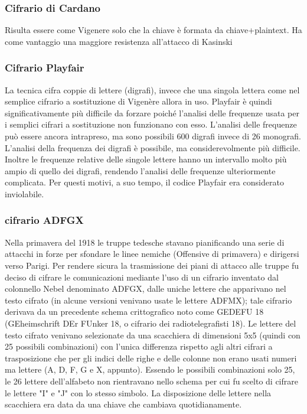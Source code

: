 \documentclass[10pt,a4paper]{article}
\begin{document}
\subsubsection{Cifrario di Cardano}
Risulta essere come Vigenere solo che la chiave è formata da chiave+plaintext. Ha come vantaggio una maggiore resistenza all'attacco di Kasinski

\subsubsection{Cifrario Playfair}
La tecnica cifra coppie di lettere (digrafi), invece che una singola lettera come nel semplice cifrario a sostituzione di Vigenère allora in uso. Playfair è quindi significativamente più difficile da forzare poiché l'analisi delle frequenze usata per i semplici cifrari a sostituzione non funzionano con esso. L'analisi delle frequenze può essere ancora intrapreso, ma sono possibili 600 digrafi invece di 26 monografi. L'analisi della frequenza dei digrafi è possibile, ma considerevolmente più difficile. Inoltre le frequenze relative delle singole lettere hanno un intervallo molto più ampio di quello dei digrafi, rendendo l’analisi delle frequenze ulteriormente complicata. Per questi motivi, a suo tempo, il codice Playfair era considerato inviolabile.

\subsubsection{cifrario ADFGX}

Nella primavera del 1918 le truppe tedesche stavano pianificando una serie di attacchi in forze per sfondare le linee nemiche (Offensive di primavera) e dirigersi verso Parigi. Per rendere sicura la trasmissione dei piani di attacco alle truppe fu deciso di cifrare le comunicazioni mediante l'uso di un cifrario inventato dal colonnello Nebel denominato ADFGX, dalle uniche lettere che apparivano nel testo cifrato (in alcune versioni venivano usate le lettere ADFMX); tale cifrario derivava da un precedente schema crittografico noto come GEDEFU 18 (GEheimschrift DEr FUnker 18, o cifrario dei radiotelegrafisti 18). Le lettere del testo cifrato venivano selezionate da una scacchiera di dimensioni 5x5 (quindi con 25 possibili combinazioni) con l'unica differenza rispetto agli altri cifrari a trasposizione che per gli indici delle righe e delle colonne non erano usati numeri ma lettere (A, D, F, G e X, appunto). Essendo le possibili combinazioni solo 25, le 26 lettere dell'alfabeto non rientravano nello schema per cui fu scelto di cifrare le lettere "I" e "J" con lo stesso simbolo. La disposizione delle lettere nella scacchiera era data da una chiave che cambiava quotidianamente.
\end{document}
